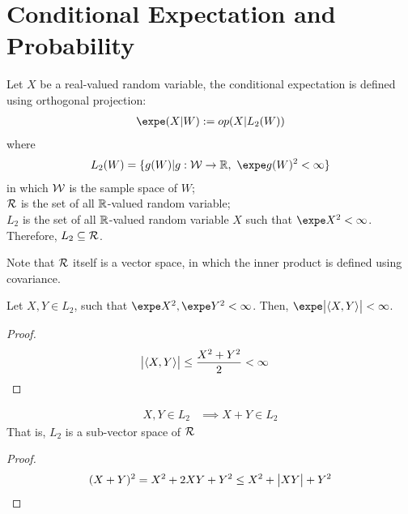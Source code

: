 \documentclass{article}
\begin{document}
   	\section{Conditional Expectation and Probability}
   	\begin{definition}
   		Let $X$ be a real-valued random variable, the conditional  expectation is defined using orthogonal projection:
   		\begin{align}
   			\expe (X | W) := op (X | L_2(W))
   		\end{align}
   		where 
   		\begin{align}
   			L_2(W) = \{g(W) | g: \mc{W} \to \R,\ \expe g(W)^2 < \infty \}
   		\end{align}
   		in which $\mathcal{{W}}$ is the sample space of $W$;\\
   		$\mathcal{{R}}$ is the set of all $\mathbb{R}$-valued random variable;\\
   		$L_2$ is the set of all $\mathbb{R}$-valued random variable $X$ such that $\expe X^2 < \infty$. \\
   		Therefore, $L_2 \subseteq \mathcal{{R}}$.
   	\end{definition}
   	
   	\begin{proposition}
   		Note that $\mathcal{{R}}$ itself is a vector space, in which the inner product is defined using covariance.
   	\end{proposition}
   	
   	\begin{proposition}
   		Let $X, Y \in L_2$, such that $\expe X^2, \expe Y^2 < \infty$. Then, $\expe \abs{\inner{X}{Y}} < \infty$.
   	\end{proposition}
   	
   	\begin{proof}
   		\begin{align}
   			\big \vert {\langle {X}, {Y} \rangle} \big \vert &\leq \frac{X^2 + Y^2}{2} < \infty
   		\end{align}
   	\end{proof}
   	
   	\begin{corollary}
   		\begin{align}
   			X, Y \in L_2 &\implies X + Y \in L_2
   		\end{align}
   		That is, $L_2$ is a sub-vector space of $\mathcal{{R}}$
   	\end{corollary}
   	
   	\begin{proof}
   		\begin{align}
   			(X + Y)^2 = X^2 + 2 X Y + Y^2 \leq X^2 + \big \vert {XY} \big \vert + Y^2
   		\end{align}
   	\end{proof}
   	
\end{document}
